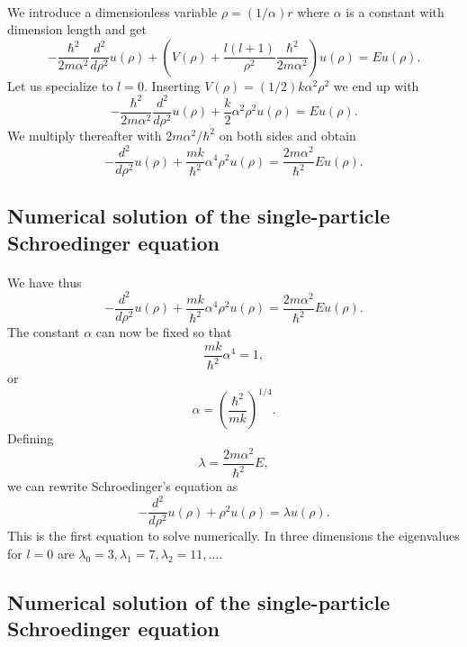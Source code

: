 \documentclass[%
twoside,                 %
final,                   %
10pt]{article}
\begin{document}
\paragraph{}
We introduce a dimensionless variable $\rho = (1/\alpha) r$
where $\alpha$ is a constant with dimension length and get
\[
  -\frac{\hbar^2}{2 m \alpha^2} \frac{d^2}{d\rho^2} u(\rho) 
       + \left ( V(\rho) + \frac{l (l + 1)}{\rho^2}
         \frac{\hbar^2}{2 m\alpha^2} \right ) u(\rho)  = E u(\rho) .
\]
Let us specialize to $l=0$. 
Inserting $V(\rho) = (1/2) k \alpha^2\rho^2$ we end up with
\[
  -\frac{\hbar^2}{2 m \alpha^2} \frac{d^2}{d\rho^2} u(\rho) 
       + \frac{k}{2} \alpha^2\rho^2u(\rho)  = E u(\rho) .
\]
We multiply thereafter with $2m\alpha^2/\hbar^2$ on both sides and obtain
\[
  -\frac{d^2}{d\rho^2} u(\rho) 
       + \frac{mk}{\hbar^2} \alpha^4\rho^2u(\rho)  = \frac{2m\alpha^2}{\hbar^2}E u(\rho) .
\]




\subsection*{Numerical solution of the single-particle Schroedinger equation}

\paragraph{}
We have thus
\[
  -\frac{d^2}{d\rho^2} u(\rho) 
       + \frac{mk}{\hbar^2} \alpha^4\rho^2u(\rho)  = \frac{2m\alpha^2}{\hbar^2}E u(\rho) .
\]
The constant $\alpha$ can now be fixed
so that
\[
\frac{mk}{\hbar^2} \alpha^4 = 1,
\]
or 
\[
\alpha = \left(\frac{\hbar^2}{mk}\right)^{1/4}.
\]
Defining
\[
\lambda = \frac{2m\alpha^2}{\hbar^2}E,
\]
we can rewrite Schroedinger's equation as
\[
  -\frac{d^2}{d\rho^2} u(\rho) + \rho^2u(\rho)  = \lambda u(\rho) .
\]
This is the first equation to solve numerically. In three dimensions 
the eigenvalues for $l=0$ are 
$\lambda_0=3,\lambda_1=7,\lambda_2=11,\dots .$




\subsection*{Numerical solution of the single-particle Schroedinger equation}

\end{document}
